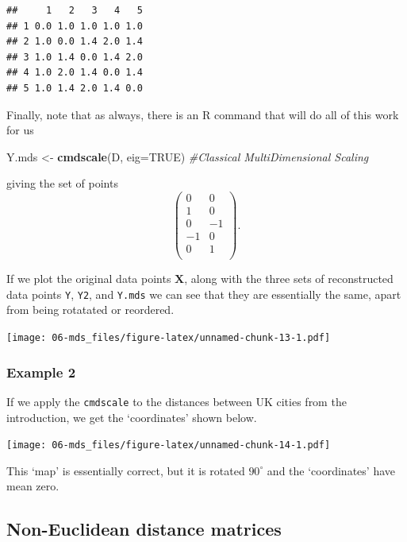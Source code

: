 \documentclass[
]{book}
\newenvironment{Shaded}{\begin{snugshade}}{\end{snugshade}}
\newcommand{\AttributeTok}[1]{\textcolor[rgb]{0.13,0.29,0.53}{#1}}
\newcommand{\CommentTok}[1]{\textcolor[rgb]{0.56,0.35,0.01}{\textit{#1}}}
\newcommand{\ConstantTok}[1]{\textcolor[rgb]{0.56,0.35,0.01}{#1}}
\newcommand{\FunctionTok}[1]{\textcolor[rgb]{0.13,0.29,0.53}{\textbf{#1}}}
\newcommand{\NormalTok}[1]{#1}
\newcommand{\OtherTok}[1]{\textcolor[rgb]{0.56,0.35,0.01}{#1}}
\theoremstyle{definition}
\theoremstyle{definition}
\theoremstyle{definition}
\theoremstyle{definition}
\theoremstyle{remark}
\begin{document}
\begin{verbatim}
##     1   2   3   4   5
## 1 0.0 1.0 1.0 1.0 1.0
## 2 1.0 0.0 1.4 2.0 1.4
## 3 1.0 1.4 0.0 1.4 2.0
## 4 1.0 2.0 1.4 0.0 1.4
## 5 1.0 1.4 2.0 1.4 0.0
\end{verbatim}

Finally, note that as always, there is an R command that will do all of this work for us

\begin{Shaded}
\begin{Highlighting}[]
\NormalTok{Y.mds }\OtherTok{\textless{}{-}} \FunctionTok{cmdscale}\NormalTok{(D, }\AttributeTok{eig=}\ConstantTok{TRUE}\NormalTok{) }\CommentTok{\#Classical MultiDimensional Scaling}
\end{Highlighting}
\end{Shaded}

giving the set of points
\[\begin{pmatrix}0&0 \\1&0 \\0&-1 \\-1&0 \\0&1 \\\end{pmatrix}.\]

If we plot the original data points \(\mathbf X\), along with the three sets of reconstructed data points \texttt{Y}, \texttt{Y2}, and \texttt{Y.mds} we can see that they are essentially the same, apart from being rotatated or reordered.

\texttt{[image: 06-mds\_files/figure-latex/unnamed-chunk-13-1.pdf]}

\hypertarget{example-2}{%
\subsubsection*{Example 2}\label{example-2}}

If we apply the \texttt{cmdscale} to the distances between UK cities from the introduction, we get the `coordinates' shown below.

\texttt{[image: 06-mds\_files/figure-latex/unnamed-chunk-14-1.pdf]}

This `map' is essentially correct, but it is rotated \(90^\circ\) and the `coordinates' have mean zero.

\hypertarget{non-euclidean-distance-matrices}{%
\subsection{Non-Euclidean distance matrices}\label{non-euclidean-distance-matrices}}
\end{document}
